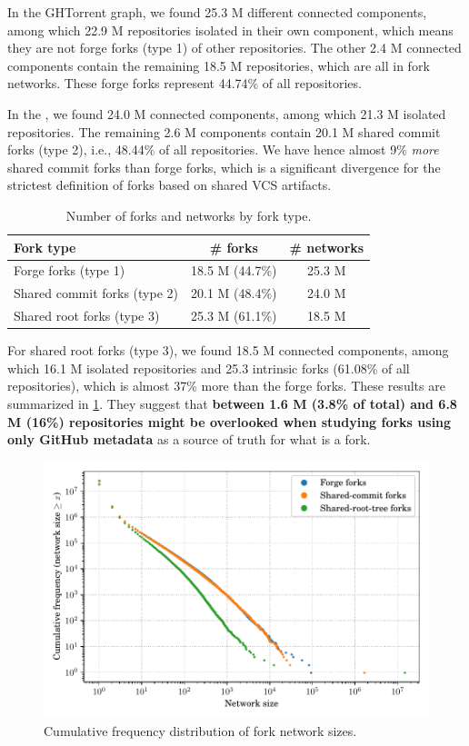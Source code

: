 In the GHTorrent graph, we found 25.3 M different connected components, among
which 22.9 M repositories isolated in their own component, which means they are
not forge forks (type 1) of other repositories.  The other 2.4 M connected
components contain the remaining 18.5 M repositories, which are all in fork
networks.  These forge forks represent 44.74\% of all repositories.

In the \SWHGD{}, we found 24.0 M connected components, among which 21.3 M
isolated repositories. The remaining 2.6 M components contain 20.1 M shared
commit forks (type 2), i.e., 48.44\% of all repositories. We have hence almost
9\% \emph{more} shared commit forks than forge forks, which is a significant
divergence for the strictest definition of forks based on shared \gls{VCS}
artifacts.

\begin{table}[t]
    \centering
    \caption{Number of forks and networks by fork type.}%
    \label{tab:fork-network-results}
    \begin{tabular}{l|c|c}
      \textbf{Fork type} & \textbf{\# forks} & \textbf{\# networks} \\
      \hline
      Forge forks (type 1)         & 18.5 M (44.7\%) & 25.3 M \\
      Shared commit forks (type 2) & 20.1 M (48.4\%) & 24.0 M \\
      Shared root forks (type 3)   & 25.3 M (61.1\%) & 18.5 M \\
    \end{tabular}
\end{table}

For shared root forks (type 3), we found 18.5 M connected components, among
which 16.1 M isolated repositories and 25.3 intrinsic forks (61.08\% of all
repositories), which is almost 37\% more than the forge forks. These results
are summarized in \cref{tab:fork-network-results}.  They suggest that
\textbf{between 1.6 M (3.8\% of total) and 6.8 M (16\%) repositories might
  be overlooked when studying forks using only GitHub metadata} as a source of
truth for what is a fork.

\begin{figure}[t]
    \centering
    \includegraphics[width=0.8\linewidth]{img/forks/fork-network-freq-distribution.pdf}
    \caption{Cumulative frequency distribution of fork network sizes.}%
    \label{fig:fork-network-freq-distrib}
\end{figure}


